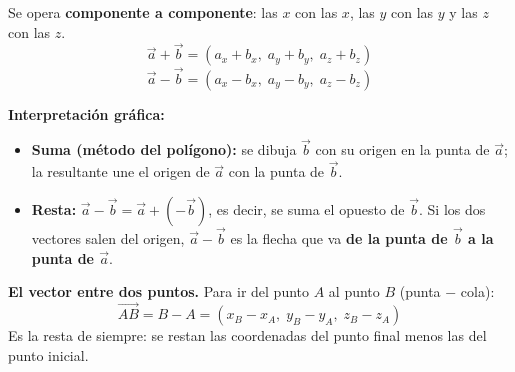 \documentclass[12pt, letterpaper]{article}
\begin{document}
\begin{cuadroteoria}
  Se opera \textbf{componente a componente}: las $x$ con las $x$, las $y$ con las $y$ y las $z$ con las $z$.
  $$\vec{a} + \vec{b} = (a_x + b_x,\; a_y + b_y,\; a_z + b_z)$$
  $$\vec{a} - \vec{b} = (a_x - b_x,\; a_y - b_y,\; a_z - b_z)$$

  \textbf{Interpretación gráfica:}
  \begin{itemize}[leftmargin=*]
    \item \textbf{Suma (método del polígono):} se dibuja $\vec{b}$ con su origen en la punta de $\vec{a}$; la resultante une el origen de $\vec{a}$ con la punta de $\vec{b}$.
    \item \textbf{Resta:} $\vec{a} - \vec{b} = \vec{a} + (-\vec{b})$, es decir, se suma el opuesto de $\vec{b}$. Si los dos vectores salen del origen, $\vec{a}-\vec{b}$ es la flecha que va \textbf{de la punta de $\vec{b}$ a la punta de $\vec{a}$}.
  \end{itemize}
  \begin{center}
  \end{center}
\end{cuadroteoria}

\begin{cuadroteoria}
  \textbf{El vector entre dos puntos.} Para ir del punto $A$ al punto $B$ (punta $-$ cola):
  $$\overrightarrow{AB} = B - A = (x_B - x_A,\; y_B - y_A,\; z_B - z_A)$$
  Es la resta de siempre: se restan las coordenadas del punto final menos las del punto inicial.
\end{cuadroteoria}
\end{document}

